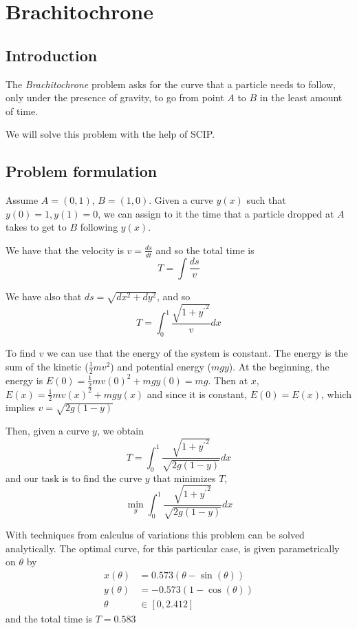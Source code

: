 \documentclass[12pt]{article}
\begin{document}
\section*{Brachitochrone}

\subsection*{Introduction}

The \emph{Brachitochrone} problem asks for the curve that a particle needs to
follow, only under the presence of gravity, to go from point $A$ to $B$ in the
least amount of time.

We will solve this problem with the help of SCIP.

\subsection*{Problem formulation}

Assume $A = (0,1)$, $B = (1,0)$. Given a curve $y(x)$ such that $y(0) = 1, y(1) = 0$, we can assign to it
the time that a particle dropped at $A$ takes to get to $B$ following $y(x)$.

We have that the velocity is $v = \tfrac{ds}{dt}$ and so the total time is
\[
    T = \int \frac{ds}{v}
\]

We have also that $ds = \sqrt{dx^2 + dy^2}$, and so
\[
    T = \int_0^1 \frac{\sqrt{1 + {y^{'}}^2}}{v} dx
\]

To find $v$ we can use that the energy of the system is constant.
The energy is the sum of the kinetic ($\tfrac{1}{2} m v^2$) and potential energy ($m g y$).
At the beginning, the energy is $E(0) = \tfrac{1}{2} m v(0)^2 + m g y(0) = m g$.
Then at $x$, $E(x) = \tfrac{1}{2} m v(x)^2 + m g y(x)$ and since it is constant, $E(0) = E(x)$, which implies
$v = \sqrt{2g(1 - y)}$

Then, given a curve $y$, we obtain
\[
    T = \int_0^1 \frac{\sqrt{1 + {y^{'}}^2}}{\sqrt{2g(1 - y)}} dx
\]
and our task is to find the curve $y$ that minimizes $T$,
\[
    \min_{y} \int_0^1 \frac{\sqrt{1 + {y^{'}}^2}}{\sqrt{2g(1 - y)}} dx
\]

With techniques from calculus of variations this problem can be solved analytically.
The optimal curve, for this particular case, is given parametrically on $\theta$ by
\begin{align*}
    x(\theta) &= 0.573 (\theta - \sin(\theta)) \\
    y(\theta) &= -0.573 (1 - \cos(\theta)) \\
       \theta &\in [0, 2.412]
\end{align*}
and the total time is $T = 0.583$
\end{document}
